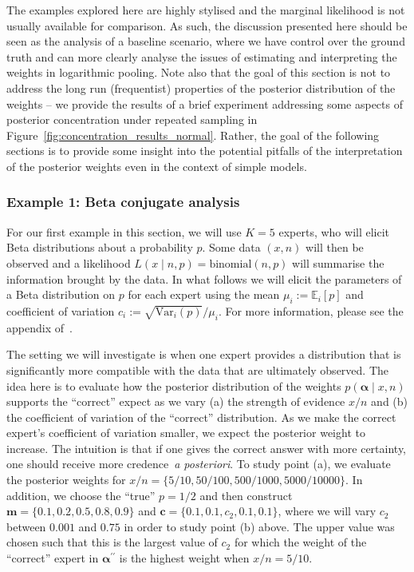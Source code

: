 \documentclass[a4paper, notitlepage, 11pt]{article}
\begin{document}
The examples explored here are highly stylised and the marginal likelihood is not usually available for comparison.
As such, the discussion presented here should be seen as the analysis of a baseline scenario, where we have control over the ground truth and can more clearly analyse the issues of estimating and interpreting the weights in logarithmic pooling.
Note also that the goal of this section is not to address the long run (frequentist) properties of the posterior distribution of the weights -- we provide the results of a brief experiment addressing some aspects of posterior concentration under repeated sampling in Figure~\ref{fig:concentration_results_normal}.
Rather, the goal of the following sections is to provide some insight into the potential pitfalls of the interpretation of the posterior weights even in the context of simple models.

\subsubsection{Example 1: Beta conjugate analysis}
\label{sec:learning_rate_beta}

For our first example in this section, we will use $K = 5$ experts, who will elicit Beta distributions about a probability $p$.
Some data $(x, n)$ will then be observed and a likelihood $L(x \mid n, p) = \text{binomial}(n, p)$ will summarise the information brought by the data.
In what follows we will elicit the parameters of a Beta distribution on $p$ for each expert using the mean $\mu_i :=  \mathbb{E}_i[p]$ and coefficient of variation $c_i := \sqrt{\text{Var}_i(p)}/ \mu_i$.
For more information, please see the appendix of~\cite{Coelho2015}.

The
setting we will investigate is when one expert provides a distribution that is significantly more compatible with the data that are ultimately observed.
The idea here is to evaluate how the posterior distribution of the weights $p(\boldsymbol\alpha \mid x, n)$ supports the ``correct'' expect as we vary (a) the strength of evidence $x/n$ and (b) the coefficient of variation of the ``correct'' distribution.
As we make the correct expert's coefficient of variation smaller, we expect the posterior weight to increase.
The intuition is that if one gives the correct answer with more certainty, one should receive more credence~\textit{a posteriori}.
To study point (a), we evaluate the posterior weights for $x/n = \{5/10, 50/100, 500/1000, 5000/10000 \}$.
In addition, we choose the ``true'' $p = 1/2$ and then construct $\boldsymbol{m} = \{0.1, 0.2, 0.5, 0.8, 0.9\}$ and $\boldsymbol c = \{0.1, 0.1, c_2, 0.1, 0.1 \}$, where we will vary $c_2$ between $0.001$ and $0.75$ in order to study point (b) above.
The upper value was chosen such that this is the largest value of $c_2$ for which the weight of the ``correct'' expert in $\boldsymbol\alpha^{\prime\prime}$ is the highest weight when $x/n=5/10$.
\end{document}
